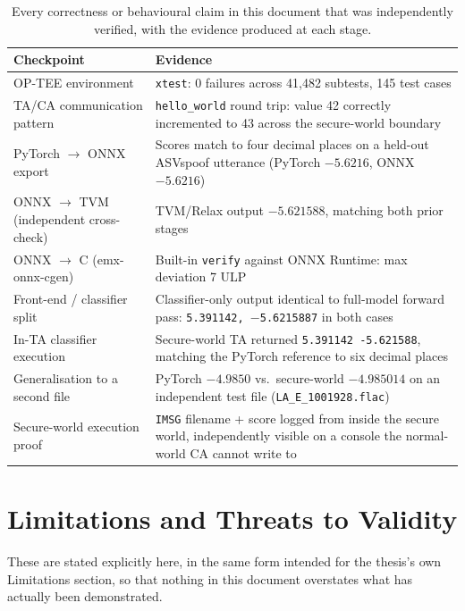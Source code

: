 \documentclass[11pt,a4paper]{report}
\newcommand{\code}[1]{\texttt{\small #1}}
\begin{document}
\begin{table}[H]
\centering
\small
\begin{tabularx}{\textwidth}{@{}p{3.6cm}X@{}}
\toprule
\textbf{Checkpoint} & \textbf{Evidence} \\
\midrule
OP-TEE environment & \code{xtest}: 0 failures across 41{,}482 subtests, 145 test cases \\
TA/CA communication pattern & \code{hello\_world} round trip: value 42 correctly incremented to 43
across the secure-world boundary \\
PyTorch $\to$ ONNX export & Scores match to four decimal places on a held-out ASVspoof utterance
(PyTorch $-5.6216$, ONNX $-5.6216$) \\
ONNX $\to$ TVM (independent cross-check) & TVM/Relax output $-5.621588$, matching both prior stages
\\
ONNX $\to$ C (emx-onnx-cgen) & Built-in \code{verify} against ONNX Runtime: max deviation 7 ULP \\
Front-end / classifier split & Classifier-only output identical to full-model forward pass:
\code{5.391142, $-$5.6215887} in both cases \\
In-TA classifier execution & Secure-world TA returned \code{5.391142 -5.621588}, matching the
PyTorch reference to six decimal places \\
Generalisation to a second file & PyTorch $-4.9850$ vs.\ secure-world $-4.985014$ on an independent
test file (\code{LA\_E\_1001928.flac}) \\
Secure-world execution proof & \code{IMSG} filename + score logged from inside the secure world,
independently visible on a console the normal-world CA cannot write to \\
\bottomrule
\end{tabularx}
\caption{Every correctness or behavioural claim in this document that was independently verified,
with the evidence produced at each stage.}
\label{tab:verification}
\end{table}

\chapter{Limitations and Threats to Validity}
\label{ch:limitations}

These are stated explicitly here, in the same form intended for the thesis's own Limitations
section, so that nothing in this document overstates what has actually been demonstrated.
\end{document}
